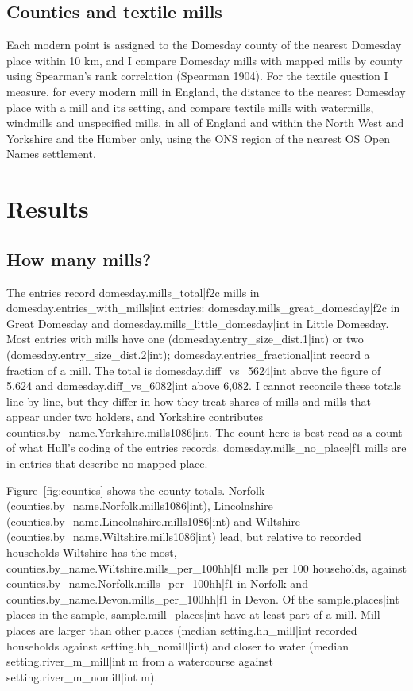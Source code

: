 \documentclass[11pt,a4paper]{article}
\begin{document}
\subsection{Counties and textile mills}

Each modern point is assigned to the Domesday county of the nearest Domesday place within 10 km, and I compare Domesday mills with mapped mills by county using Spearman's rank correlation (Spearman 1904). For the textile question I measure, for every modern mill in England, the distance to the nearest Domesday place with a mill and its setting, and compare textile mills with watermills, windmills and unspecified mills, in all of England and within the North West and Yorkshire and the Humber only, using the ONS region of the nearest OS Open Names settlement.

\section{Results}

\subsection{How many mills?}

The entries record {{domesday.mills_total|f2c}} mills in {{domesday.entries_with_mills|int}} entries: {{domesday.mills_great_domesday|f2c}} in Great Domesday and {{domesday.mills_little_domesday|int}} in Little Domesday. Most entries with mills have one ({{domesday.entry_size_dist.1|int}}) or two ({{domesday.entry_size_dist.2|int}}); {{domesday.entries_fractional|int}} record a fraction of a mill. The total is {{domesday.diff_vs_5624|int}} above the figure of 5,624 and {{domesday.diff_vs_6082|int}} above 6,082. I cannot reconcile these totals line by line, but they differ in how they treat shares of mills and mills that appear under two holders, and Yorkshire contributes {{counties.by_name.Yorkshire.mills1086|int}}. The count here is best read as a count of what Hull's coding of the entries records. {{domesday.mills_no_place|f1}} mills are in entries that describe no mapped place.

Figure~\ref{fig:counties} shows the county totals. Norfolk ({{counties.by_name.Norfolk.mills1086|int}}), Lincolnshire ({{counties.by_name.Lincolnshire.mills1086|int}}) and Wiltshire ({{counties.by_name.Wiltshire.mills1086|int}}) lead, but relative to recorded households Wiltshire has the most, {{counties.by_name.Wiltshire.mills_per_100hh|f1}} mills per 100 households, against {{counties.by_name.Norfolk.mills_per_100hh|f1}} in Norfolk and {{counties.by_name.Devon.mills_per_100hh|f1}} in Devon. Of the {{sample.places|int}} places in the sample, {{sample.mill_places|int}} have at least part of a mill. Mill places are larger than other places (median {{setting.hh_mill|int}} recorded households against {{setting.hh_nomill|int}}) and closer to water (median {{setting.river_m_mill|int}} m from a watercourse against {{setting.river_m_nomill|int}} m).
\end{document}
